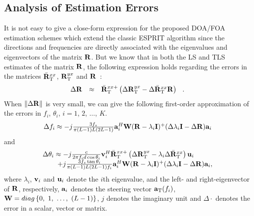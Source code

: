 \documentclass[a4paper,10pt,fleqn,twocolumn]{IEEEtran}
\newcommand{\ba}{{\bf a}}
\newcommand{\bv}{{\bf v}}
\newcommand{\bu}{{\bf u}}
\newcommand{\bI}{{\bf I}}
\newcommand{\bR}{{\bf R}}
\newcommand{\bW}{{\bf W}}
\begin{document}
\subsection{Analysis of Estimation Errors}
It is not easy to give a close-form expression for the proposed
DOA/FOA estimation schemes which extend the classic ESPRIT
algorithm since the directions and frequencies are directly
associated with the eigenvalues and eigenvectors of the matrix
$\bR$. But we know that in both the LS and TLS estimates of the
matrix $\bR$, the following expression holds regarding the errors
in the matrices $\bar{\bR}_{\rm T}^{xx}$, $\bR_{\rm T}^{yx}$ and
$\bR$~\cite{Rao89}:
\begin{equation}
\begin{array}{rcl}
\Delta\bR&\approx&\bar{\bR}_{\rm T}^{xx+}\left(\Delta\bR_{\rm
T}^{yx}-\Delta\bar{\bR}_{\rm T}^{xx}\bR\right)\hspace{0.1in}.
\end{array}\label{DeltaR}
\end{equation}
\noindent When $\|\Delta\bR\|$ is very small, we can give the
following first-order approximation of the errors in $f_i$,
$\theta_i$, $i=1$, $2$, $\ldots$, $K$.
\begin{equation}
\begin{array}{l}
\Delta f_i\approx
-j{3f_s\over\pi(L-1)L(2L-1)}\ba_i^H\bW(\bR-\lambda_i\bI)^{+}(\Delta\lambda_i\bI-\Delta\bR)\ba_i
\end{array}\label{approx_theta}
\end{equation}
\noindent and
\begin{equation}
\begin{array}{l}
\Delta\theta_i \approx -j{c\over 2\pi
f_id\cos\theta_i}\bv_i^H\bar{\bR}_{\rm T}^{xx+}\left(\Delta\bR_{\rm T}^{yx}-\lambda_i\Delta\bar{\bR}_{\rm T}^{xx}\right)\bu_i\\
\hspace{0.3in}+j{3f_s\tan\theta_i\over\pi(L-1)L(2L-1)f_i}\ba_i^H\bW(\bR-\lambda_i\bI)^{+}(\Delta\lambda_i\bI-\Delta\bR)\ba_i,
\end{array}\label{approx_f}
\end{equation}
\noindent where $\lambda_i$, $\bv_i$ and $\bu_i$ denote the $i$th
eigenvalue, and the left- and right-eigenvector of $\bR$,
respectively, $\ba_i$ denotes the steering vector $\ba_{\rm
T}(f_i)$, $\bW=\mbox{diag}\left\{0,\ 1,\ \ldots,\ (L-1)\right\}$,
$j$ denotes the imaginary unit and $\Delta\cdot$ denotes the error
in a scalar, vector or matrix.
\end{document}
